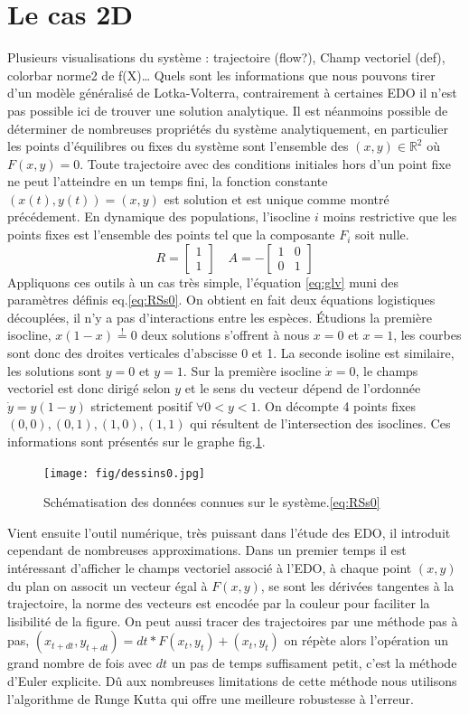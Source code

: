 \documentclass{wsdcr}
\begin{document}
\section{Le cas 2D}
\label{sec:lv2}
Plusieurs visualisations du système : trajectoire (flow?), Champ vectoriel (def), colorbar norme2 de f(X)…
Quels sont les informations que nous pouvons tirer d'un modèle généralisé de Lotka-Volterra, contrairement à certaines EDO il n'est pas possible ici de trouver une solution analytique. Il est néanmoins possible de déterminer de nombreuses propriétés du système analytiquement, en particulier les points d'équilibres ou fixes du système sont l'ensemble des $(x,y)\in \mathbb{R}^2$ où $F(x,y)=0$. Toute trajectoire avec des conditions initiales hors d'un point fixe ne peut l'atteindre en un temps fini, la fonction constante $(x(t),y(t))=(x,y)$ est solution et est unique comme montré précédement. En dynamique des populations, l'isocline $i$ moins restrictive que les points fixes est l'ensemble des points tel que la composante $F_i$ soit nulle.
\begin{equation}
R={\begin{bmatrix}1\\1\end{bmatrix}}\quad A =-{\begin{bmatrix}1&0\\0&1\end{bmatrix}}
\label{eq:RSs0}
\end{equation}
Appliquons ces outils à un cas très simple, l'équation \ref{eq:glv} muni des paramètres définis eq.\ref{eq:RSs0}. On obtient en fait deux équations logistiques découplées, il n'y a pas d'interactions entre les espèces. Étudions la première isocline, $x(1-x)\overset{!}{=}0$ deux solutions s'offrent à nous $x=0$ et $x=1$, les courbes sont donc des droites verticales d'abscisse 0 et 1. La seconde isoline est similaire, les solutions sont $y=0$ et $y=1$. Sur la première isocline $\dot{x}=0$, le champs vectoriel est donc dirigé selon $y$ et le sens du vecteur dépend de l'ordonnée $\dot{y}=y(1-y)$  strictement positif $\forall 0<y<1$. On décompte 4 points fixes ${(0,0),(0,1),(1,0),(1,1)}$ qui résultent de l'intersection des isoclines. Ces informations sont présentés sur le graphe fig.\ref{fig:dessinlv2s0}.
\begin{figure}
    \centering
    \texttt{[image: fig/dessins0.jpg]}
    \caption{Schématisation des données connues sur le système.\ref{eq:RSs0}}
    \label{fig:dessinlv2s0}
\end{figure}
Vient ensuite l'outil numérique, très puissant dans l'étude des EDO, il introduit cependant de nombreuses approximations. Dans un premier temps il est intéressant d'afficher le champs vectoriel associé à l'EDO, à chaque point $(x,y)$ du plan on associt un vecteur égal à $F(x,y)$, se sont les dérivées tangentes à la trajectoire, la norme des vecteurs est encodée par la couleur pour faciliter la lisibilité de la figure. On peut aussi tracer des trajectoires par une méthode pas à pas, $(x_{t+dt},y_{t+dt})=dt*F(x_{t},y_{t})+(x_{t},y_{t})$ on répète alors l'opération un grand nombre de fois avec $dt$ un pas de temps suffisament petit, c'est la méthode d'Euler explicite. Dû aux nombreuses limitations de cette méthode nous utilisons l'algorithme de Runge Kutta qui offre une meilleure robustesse à l'erreur.
\end{document}

